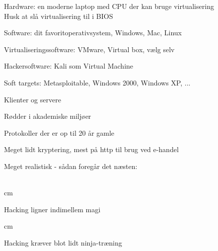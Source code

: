 \documentclass[20pt,landscape,a4paper,footrule]{foils}
\begin{document}


\begin{list2}
\item Hardware: en moderne laptop med CPU der kan bruge virtualisering\\
Husk at slå virtualisering til i BIOS
\item Software: dit favoritoperativsystem, Windows, Mac, Linux
\item Virtualiseringssoftware: VMware, Virtual box, vælg selv
\item Hackersoftware: Kali som Virtual Machine 
\item Soft targets: Metasploitable, Windows 2000, Windows XP, ...
\end{list2}







\begin{list1}
\item Klienter og servere
\item Rødder i akademiske miljøer
\item Protokoller der er op til 20 år gamle
\item Meget lidt kryptering, mest på http til brug ved e-handel
\end{list1}


Meget realistisk - sådan foregår det næsten:\\
\\





 cm

\centerline{Hacking ligner indimellem  magi}




 cm
\centerline{Hacking kræver blot lidt ninja-træning}
\end{document}
